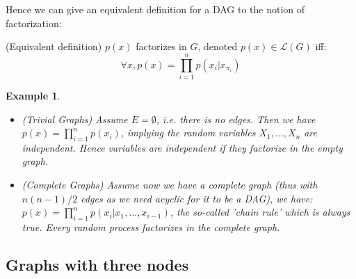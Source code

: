 \documentclass[12pt]{report}
\newtheorem{example}{Example}[section]
\begin{document}
Hence we can give an equivalent definition for a DAG to the notion of factorization: 

\begin{definition}
(Equivalent definition) $p(x)$ factorizes in $G$, denoted $p(x)\in \mathcal{L}(G)$ iff:
\begin{equation}
\forall x, p(x) = \prod_{i=1}^n p(x_i | x_{\pi_i})
\label{eq:}
\end{equation}
\end{definition}


\begin{example}
\begin{itemize}
	\item (Trivial Graphs) Assume $E = \emptyset$, \emph{i.e.} there is no edges. Then we have $p(x) = \prod_{i=1}^n p(x_i)$, implying the random variables $X_1, \dots, X_n$ are independent. Hence variables are independent if they factorize in the empty graph. 
	\item (Complete Graphs) Assume now we have a complete graph (thus with $n(n-1)/2$ edges as we need acyclic for it to be a DAG), we have: $p(x) = \prod_{i=1}^n p(x_i | x_1, \dots, x_{i-1})$, the so-called 'chain rule' which is always true. Every random process factorizes in the complete graph.
\end{itemize}
\end{example}



\subsection{Graphs with three nodes}
\end{document}
